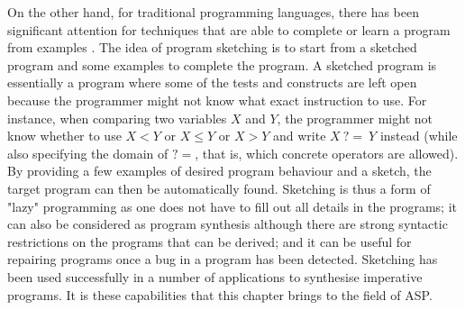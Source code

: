 
On the other hand, for traditional programming languages, there has been significant attention for techniques that are able
to complete \parencite{sketching_phd_thesis} or learn a program from examples \parencite{gulwani2015inductive}. 
The idea of program sketching is to start from a sketched program and some examples
to complete the program. A sketched program is essentially a program where some of the tests and constructs
are left open because the programmer might not know what exact instruction to use.  For instance, 
when comparing two variables $X$ and $Y$, the programmer might not know whether to use $X < Y$ or $X \leq Y$ or $X > Y$ and write 
$X~{?}{=}~Y$ instead (while also specifying the domain of ${?}{=}$, that is, which concrete operators are allowed). 
By providing a few examples of desired program behaviour and a sketch, the target program can then be automatically found.
Sketching is thus a form of "lazy" programming as one does not have to fill out all details in the programs; 
it can also be considered as program synthesis although there are strong syntactic restrictions on 
the programs that can be derived; and it can be useful for repairing programs once a bug in a program has been detected.
Sketching has been used successfully in a number of applications \parencite{sketching_original,sketch_recent,jsketch} to synthesise imperative programs.
It is these capabilities that this chapter brings to the field of ASP.


